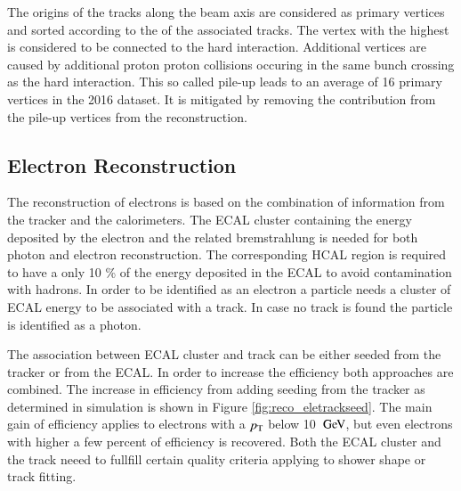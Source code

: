 The origins of the tracks along the beam axis are considered as primary vertices and sorted according to the \pt of the associated tracks.
The vertex with the highest \pt is considered to be connected to the hard interaction. 
Additional vertices are caused by additional proton proton collisions occuring in the same bunch crossing as the hard interaction.
This so called pile-up leads to an average of 16 primary vertices in the 2016 dataset. It is mitigated by removing the contribution from
the pile-up vertices from the reconstruction.

\subsection{Electron Reconstruction}

The reconstruction of electrons is based on the combination of information from the tracker and the calorimeters.
The ECAL cluster containing the energy deposited by the electron and the related bremstrahlung is needed for both photon and electron reconstruction.
The corresponding HCAL region is required to have a only 10 \% of the energy deposited in the ECAL to avoid contamination with hadrons.
In order to be identified as an electron a particle needs a cluster of ECAL energy to be associated with a track.
In case no track is found the particle is identified as a photon.

The association between ECAL cluster and track can be either seeded from the tracker or from the ECAL.
In order to increase the efficiency both approaches are combined. The increase in efficiency from adding seeding from the tracker as determined in simulation is shown in Figure \ref{fig:reco_eletrackseed}.
The main gain of efficiency applies to electrons with a $p_{\mathrm{T}}$ below 10 $\,\text{Ge\hspace{-.08em}V}$, but even electrons with higher \pt a few percent of efficiency is recovered.
Both the ECAL cluster and the track neeed to fullfill certain quality criteria applying to shower shape or track fitting.

